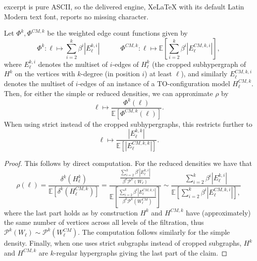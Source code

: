 \documentclass[10pt,a4paper]{amsart}
\newcommand\Ee{\mathbb{E}}
\newcommand\cP{\mathcal{P}}
\begin{document}
excerpt is pure ASCII, so the delivered engine, XeLaTeX with its default Latin Modern text font, reports no missing character.
\begin{proposition}
\label{prop:edge_count_functions}
Let $\Phi^k, \Phi^{CM, k}$ be the weighted edge count functions given by
\[\Phi^k:\ell\mapsto 
{\sum_{i=2}^k \beta^i |E^{k,i}_\ell|}
\quad\quad\quad
\Phi^{CM, k}:\ell\mapsto {\Ee\left[\sum_{i=2}^k \beta^i |E^{CM,k,i}_\ell|\right]},\]
where $E^{k,i}_\ell$ denotes the multiset of $i$-edges of $H^k_\ell$ (the cropped subhypergraph of $H^k$ on the vertices with $k$-degree (in position $i$) at least $\ell$), and similarly $E^{CM,k,i}_\ell$ denotes the multiset of $i$-edges of an instance of a TO-configuration model $H^{CM,k}_\ell$. 
Then, for either the simple or reduced densities, we can approximate $\rho$ by
\[\ell\mapsto 
\frac{\Phi^k(\ell)}
{\Ee[\Phi^{CM,k}(\ell)]}.\]
When using strict instead of the cropped subhypergraphs, this restricts further to 
\[
\ell\mapsto 
\frac{|E^{k,k}_\ell|}
{\Ee[|E^{CM,k,k}_\ell|]}.
\]
\end{proposition}

\begin{proof}
This follows by direct computation.  For the reduced densities we have that 
\[
\rho(\ell)= 
\frac{\delta^{k}(H^k_\ell)}
{\Ee[\delta^{k}(H^{CM,k}_\ell)]}
=
\frac{\frac{\sum_{i=2}^k \beta^i |E^{k,i}_\ell|}
{\beta^k\cP^k(W_\ell)}
}
{\Ee\left[
\frac{\sum_{i=2}^k \beta^i |E^{CM,k,i}_\ell|}
{{\beta^k\cP^k(W^{CM}_\ell)}}
\right]}
\sim
\frac{\sum_{i=2}^k \beta^i |E^{k,i}_\ell|}
{\Ee[\sum_{i=2}^k \beta^i |E^{CM,k,i}_\ell|],}
\]
where the last part holds as by construction $H^k$ and $H^{CM,k}$ have (approximately) the same number of vertices across all levels of the filtration, thus $\cP^k(W_\ell)\sim\cP^k(W^{CM}_\ell)$.  The computation follows similarly for the simple density.  Finally, when one uses strict subgraphs instead of cropped subgraphs, $H^k$ and $H^{CM,k}$ are $k$-regular hypergraphs giving the last part of the claim. 
\end{proof}
\end{document}
